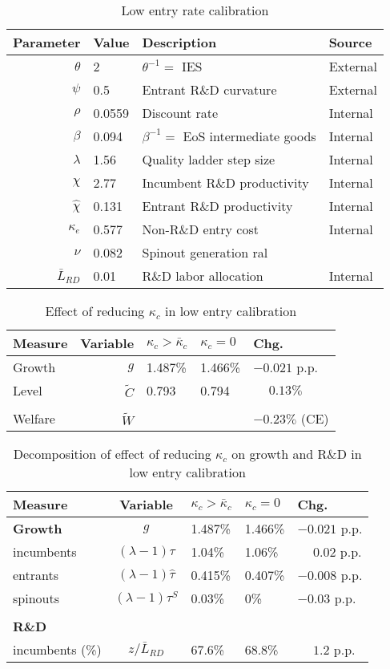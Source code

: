 \documentclass[ecta,nameyear,draft]{econsocart}
\theoremstyle{plain}
\theoremstyle{remark}
\begin{document}
\begin{appendix}
\begin{table}[]
	\centering
	\caption{Low entry rate calibration}\label{calibration_lowEntry_parameters}
	\begin{tabular}{rlll}
		\toprule \toprule
		Parameter & Value & Description & Source \tabularnewline
		\midrule
		$\theta$ & 2 & $\theta^{-1} = $ IES & External 
		\tabularnewline
		$\psi$ & 0.5 & Entrant R\&D curvature & External \tabularnewline
		$\rho$ & 0.0559 & Discount rate  & Internal \tabularnewline
		$\beta$ & 0.094 & $\beta^{-1} = $ EoS intermediate goods & Internal \tabularnewline 
		$\lambda$ & 1.56 & Quality ladder step size & Internal 
		\tabularnewline
		$\chi$ & 2.77 & Incumbent R\&D productivity & Internal 
		\tabularnewline
		$\hat{\chi}$ & 0.131 & Entrant R\&D productivity & Internal \tabularnewline 
		$\kappa_e$ & 0.577 & Non-R\&D entry cost & Internal \tabularnewline
		$\nu$ & 0.082 & Spinout generation ral\tabularnewline
		$\bar{L}_{RD}$ & 0.01 & R\&D labor allocation  & Internal \tabularnewline
		\bottomrule
	\end{tabular}
\end{table}

\begin{table}
	\centering
	\caption{Effect of reducing $\kappa_c$ in low entry calibration}\label{reducing_kappa_c_table_lowEntry}
	\begin{tabular}{lrlll}
		\toprule \toprule
		Measure & Variable & $\kappa_c > \bar{\kappa}_c$ & $\kappa_c = 0$ & Chg. \tabularnewline
		\midrule
		Growth & $g$ & 1.487\% & 1.466\% & $-0.021$ p.p. \tabularnewline
		Level & $\tilde{C}$  & 0.793 &  0.794 & $\phantom{-}0.13\%$ \tabularnewline 
		\tabularnewline
		Welfare & $\tilde{W}$  &  & & $-0.23\%$ (CE)  \tabularnewline
		\bottomrule
	\end{tabular}
\end{table}

\begin{table}[]
	\centering
	\caption{Decomposition of effect of reducing $\kappa_c$ on growth and R\&D in low entry calibration}\label{reducing_kappa_c_decomposition_table_lowEntry}
	\begin{tabular}{lclll}
		\toprule \toprule
		Measure & Variable & $\kappa_c > \bar{\kappa}_c$ & $\kappa_c = 0$ & Chg. \tabularnewline
		\midrule
		\textbf{Growth} & $g$ & 1.487\% & 1.466\% & $-0.021$ p.p.\tabularnewline
		\multicolumn{1}{l}{\quad incumbents} & $(\lambda -1) \tau$  & 1.04\% & 1.06\% & $\phantom{-}0.02$ p.p. \tabularnewline
		\multicolumn{1}{l}{\quad entrants} & $(\lambda -1) \hat{\tau}$ & 0.415\% & 0.407\% & $-0.008$ p.p. \tabularnewline
		\multicolumn{1}{l}{\quad spinouts} & $(\lambda -1) \tau^S$ & 0.03\% & 0\% & $-0.03$ p.p. \tabularnewline
		\tabularnewline
		\textbf{R\&D} & & & & 
		\tabularnewline
		\multicolumn{1}{l}{\quad incumbents (\%)}  & $z / \bar{L}_{RD}$ & 67.6\% & 68.8\% & $\phantom{-} 1.2$ p.p. \tabularnewline 
		

\end{tabular}
\end{table}
\end{appendix}
\end{document}

